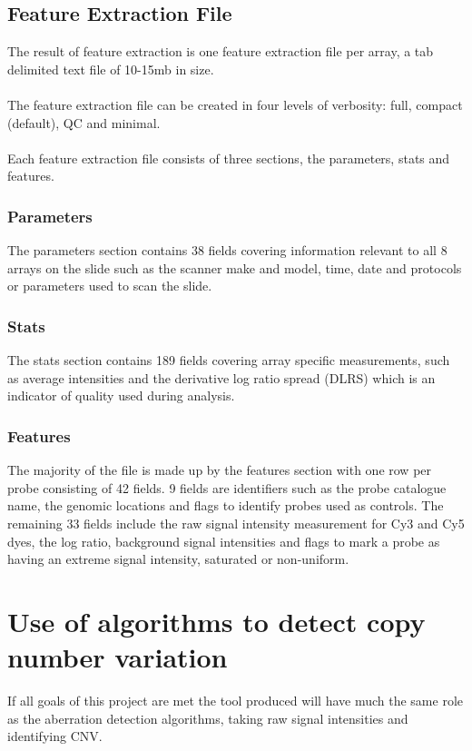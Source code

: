 \subsection{Feature Extraction File}
The result of feature extraction is one feature extraction file per array, a tab delimited text file of 10-15mb in size.
\paragraph*{}
The feature extraction file can be created in four levels of  verbosity: full, compact (default), QC and minimal. 
\paragraph*{}
Each feature extraction file consists of three sections, the parameters, stats and features.  

\subsubsection{Parameters}
The parameters section contains 38 fields covering information relevant to all 8 arrays on the slide such as the scanner make and model, time, date and protocols or parameters used to scan the slide. 

\subsubsection{Stats}
The stats section  contains 189 fields covering array specific measurements, such as average intensities and the derivative log ratio spread (DLRS) which is an indicator of quality used during analysis.

\subsubsection{Features}
The majority of the file is made up by the features section with one row per probe consisting of 42 fields. 9 fields are identifiers such as the probe catalogue name, the genomic locations and flags to identify probes used as controls. The remaining 33 fields include the raw signal intensity measurement for Cy3 and Cy5 dyes, the log ratio, background signal intensities and flags to mark a probe as having an extreme signal intensity, saturated or non-uniform.

\section{Use of algorithms to detect copy number variation}
If all goals of this project are met the tool produced will have much the same role as the aberration detection algorithms, taking raw signal intensities and identifying CNV.
